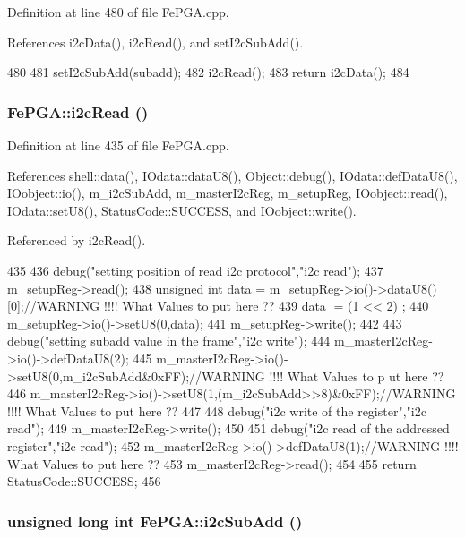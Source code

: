 Definition at line 480 of file FePGA.cpp.

References i2cData(), i2cRead(), and setI2cSubAdd().


\begin{DoxyCode}
480                                                         {
481   setI2cSubAdd(subadd);
482   i2cRead();
483   return i2cData();
484 }
\end{DoxyCode}
\hypertarget{classFePGA_a939c5c23077210a2ad851a12694657a4}{
\subsubsection[{i2cRead}]{ FePGA::i2cRead ()}}
\label{classFePGA_a939c5c23077210a2ad851a12694657a4}


Definition at line 435 of file FePGA.cpp.

References shell::data(), IOdata::dataU8(), Object::debug(), IOdata::defDataU8(), IOobject::io(), m\_\-i2cSubAdd, m\_\-masterI2cReg, m\_\-setupReg, IOobject::read(), IOdata::setU8(), StatusCode::SUCCESS, and IOobject::write().

Referenced by i2cRead().


\begin{DoxyCode}
435                           {
436   debug("setting position of read i2c protocol","i2c read");
437   m_setupReg->read();
438   unsigned int data = m_setupReg->io()->dataU8()[0];//WARNING !!!! What Values to
       put here ??
439   data |= (1 << 2)  ;     
440   m_setupReg->io()->setU8(0,data);
441   m_setupReg->write();
442     
443   debug("setting subadd value in the frame","i2c write");
444   m_masterI2cReg->io()->defDataU8(2);
445   m_masterI2cReg->io()->setU8(0,m_i2cSubAdd&0xFF);//WARNING !!!! What Values to p
      ut here ??
446   m_masterI2cReg->io()->setU8(1,(m_i2cSubAdd>>8)&0xFF);//WARNING !!!! What Values
       to put here ??
447 
448   debug("i2c write of the register","i2c read");
449   m_masterI2cReg->write();
450 
451   debug("i2c read of the addressed register","i2c read");
452   m_masterI2cReg->io()->defDataU8(1);//WARNING !!!! What Values to put here ??
453   m_masterI2cReg->read();
454 
455   return StatusCode::SUCCESS;
456 }
\end{DoxyCode}
\hypertarget{classFePGA_ab51ac1c71e33f7444212de0e89e1f436}{
\subsubsection[{i2cSubAdd}]{\setlength{\rightskip}{0pt plus 5cm}unsigned long int FePGA::i2cSubAdd ()}}
\label{classFePGA_ab51ac1c71e33f7444212de0e89e1f436}


